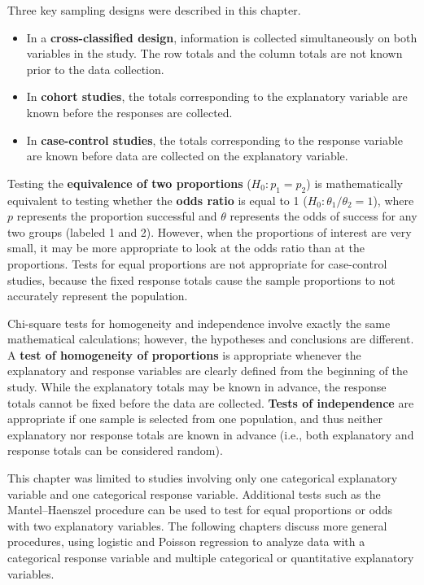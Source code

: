\documentclass[
]{report}
\providecommand{\tightlist}{%
  \setlength{\itemsep}{0pt}\setlength{\parskip}{0pt}}
\begin{document}
Three key sampling designs were described in this chapter.

\begin{itemize}
\tightlist
\item
  In a \textbf{cross-classified design}, information is collected simultaneously on both variables in the study. The row totals and the column totals are not known prior to the data collection.
\item
  In \textbf{cohort studies}, the totals corresponding to the explanatory variable are known before the responses are collected.
\item
  In \textbf{case-control studies}, the totals corresponding to the response variable are known before data are collected on the explanatory variable.
\end{itemize}

Testing the \textbf{equivalence of two proportions} (\(H_0: p_1 = p_2\)) is mathematically equivalent to testing whether the \textbf{odds ratio} is equal to 1 (\(H_0: \theta_1/\theta_2 = 1\)), where \(p\) represents the proportion successful and \(\theta\) represents the odds of success for any two groups (labeled 1 and 2). However, when the proportions of interest are very small, it may be more appropriate to look at the odds ratio than at the proportions. Tests for equal proportions are not appropriate for case-control studies, because the fixed response totals cause the sample proportions to not accurately represent the population.

Chi-square tests for homogeneity and independence involve exactly the same mathematical calculations; however, the hypotheses and conclusions are different. A \textbf{test of homogeneity of proportions} is appropriate whenever the explanatory and response variables are clearly defined from the beginning of the study. While the explanatory totals may be known in advance, the response totals cannot be fixed before the data are collected. \textbf{Tests of independence} are appropriate if one sample is selected from one population, and thus neither explanatory nor response totals are known in advance (i.e., both explanatory and response totals can be considered random).

This chapter was limited to studies involving only one categorical explanatory variable and one categorical response variable. Additional tests such as the Mantel--Haenszel procedure can be used to test for equal proportions or odds with two explanatory variables. The following chapters discuss more general procedures, using logistic and Poisson regression to analyze data with a categorical response variable and multiple categorical or quantitative explanatory variables.
\end{document}
